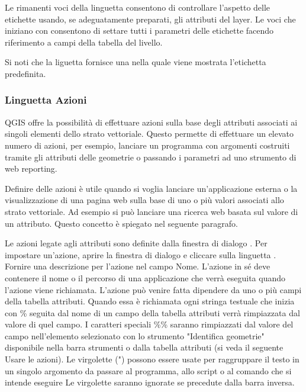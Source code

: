 Le rimanenti voci della linguetta  consentono di controllare
l'aspetto delle etichette usando, se adeguatamente preparati, gli attributi
del layer. Le voci che iniziano con  consentono di settare
tutti i parametri delle etichette facendo riferimento a campi della tabella
del livello.

Si noti che la liguetta  fornisce una 
nella quale viene mostrata l'etichetta predefinita.

\subsubsection{Linguetta Azioni}\label{label_actions}

QGIS offre la possibilità di effettuare azioni sulla base degli attributi associati ai singoli elementi dello strato vettoriale. Questo permette di effettuare un elevato numero di azioni, per esempio, lanciare un programma con argomenti costruiti tramite gli attributi delle geometrie o passando i parametri ad uno strumento di web reporting.

Definire delle azioni è utile quando si voglia lanciare un'applicazione
esterna o la visualizzazione di una pagina web sulla base di uno o più valori
associati allo strato vettoriale. Ad esempio si può lanciare una ricerca web
basata sul valore di un attributo. Questo concetto è spiegato nel seguente
paragrafo.


Le azioni legate agli attributi sono definite dalla finestra di dialogo
. Per impostare un'azione, aprire la finestra
di dialogo  e cliccare sulla linguetta
. Fornire una descrizione per l'azione nel campo Nome. L'azione in
sé deve contenere il nome o il percorso di una applicazione che verrà eseguita quando
l'azione viene richiamata. L'azione può venire fatta dipendere da uno o più campi della tabella
attributi. Quando essa è richiamata ogni stringa testuale che inizia con  \%
seguita dal nome di un campo della tabella attributi verrà rimpiazzata dal
valore di quel campo. I caratteri speciali  \%\% \index{\%\%}saranno
rimpiazzati dal valore del campo nell'elemento selezionato con lo strumento
"Identifica geometrie" disponibile nella barra strumenti o dalla tabella attributi (si veda il seguente Usare le azioni). Le virgolette
(") possono essere usate per raggruppare il testo in un singolo argomento da
passare al programma, allo script o al comando che si intende eseguire Le
virgolette saranno ignorate se precedute dalla barra inversa.


